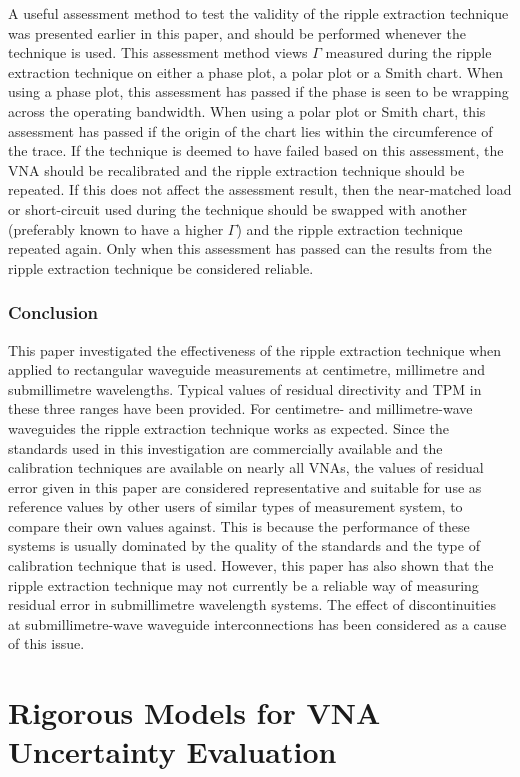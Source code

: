 \documentclass[../thesis/thesis.tex]{subfiles}
\begin{document}
A useful assessment method to test the validity of the ripple extraction technique was presented earlier in this paper, and should be performed whenever the technique is used. This assessment method views $\Gamma$ measured during the ripple extraction technique on either a phase plot, a polar plot or a Smith chart. When using a phase plot, this assessment has passed if the phase is seen to be wrapping across the operating bandwidth. When using a polar plot or Smith chart, this assessment has passed if the origin of the chart lies within the circumference of the trace. If the technique is deemed to have failed based on this assessment, the VNA should be recalibrated and the ripple extraction technique should be repeated. If this does not affect the assessment result, then the near-matched load or short-circuit used during the technique should be swapped with another (preferably known to have a higher $\Gamma$) and the ripple extraction technique repeated again. Only when this assessment has passed can the results from the ripple extraction technique be considered reliable.

\subsubsection{Conclusion}

This paper investigated the effectiveness of the ripple extraction technique when applied to rectangular waveguide measurements at centimetre, millimetre and submillimetre wavelengths. Typical values of residual directivity and TPM in these three ranges have been provided. For centimetre- and millimetre-wave waveguides the ripple extraction technique works as expected. Since the standards used in this investigation are commercially available and the calibration techniques are available on nearly all VNAs, the values of residual error given in this paper are considered representative and suitable for use as reference values by other users of similar types of measurement system, to compare their own values against. This is because the performance of these systems is usually dominated by the quality of the standards and the type of calibration technique that is used. However, this paper has also shown that the ripple extraction technique may not currently be a reliable way of measuring residual error in submillimetre wavelength systems. The effect of discontinuities at submillimetre-wave waveguide interconnections has been considered as a cause of this issue.

\section{Rigorous Models for VNA Uncertainty Evaluation}
\end{document}
